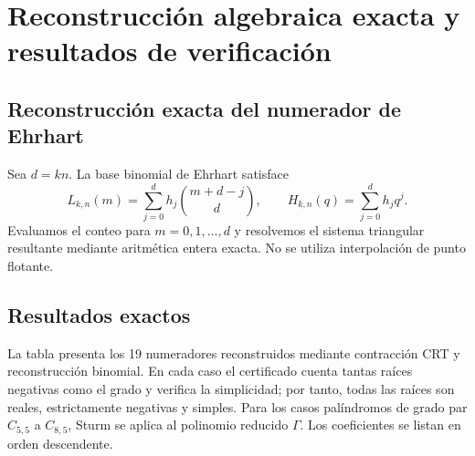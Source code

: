 \documentclass[11pt,a4paper]{article}
\theoremstyle{definition}
\begin{document}
\section{Reconstrucción algebraica exacta y resultados de verificación}

\subsection{Reconstrucción exacta del numerador de Ehrhart}

Sea $d=kn$. La base binomial de Ehrhart satisface
\[
L_{k,n}(m)=\sum_{j=0}^{d}h_j\binom{m+d-j}{d},
\qquad H_{k,n}(q)=\sum_{j=0}^{d}h_jq^j.
\]
Evaluamos el conteo para $m=0,1,\ldots,d$ y resolvemos el sistema
triangular resultante mediante aritmética entera exacta. No se utiliza
interpolación de punto flotante.

\subsection{Resultados exactos}

La tabla presenta los 19 numeradores reconstruidos mediante contracción
CRT y reconstrucción binomial. En cada caso el certificado cuenta tantas
raíces negativas como el grado y verifica la simplicidad; por tanto,
todas las raíces son reales, estrictamente negativas y simples. Para los
casos palíndromos de grado par $C_{5,5}$ a $C_{8,5}$, Sturm se aplica al
polinomio reducido $\Gamma$. Los coeficientes se listan en orden
descendente.
\end{document}
